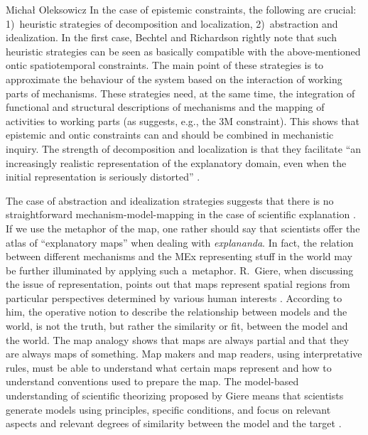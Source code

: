\begin{artengenv}{Michał Oleksowicz}
In the case of epistemic constraints, the following are crucial: 1)~heuristic strategies of decomposition and localization, 2)~abstraction and idealization. In the first case, Bechtel and Richardson
\parencite*[][]{bechtel_discovering_2010} %
 rightly note that such heuristic strategies can be seen as basically compatible with the above-mentioned ontic spatiotemporal constraints. The main point of these strategies is to approximate the behaviour of the system based on the interaction of working parts of mechanisms. These strategies need, at the same time, the integration of functional and structural descriptions of mechanisms and the mapping of activities to working parts (as suggests, e.g., the 3M constraint). This shows that epistemic and ontic constraints can and should be combined in mechanistic inquiry. The strength of decomposition and localization is that they facilitate ``an increasingly realistic representation of the explanatory domain, even when the initial representation is seriously distorted'' 
\parencite[][p.8]{bechtel_discovering_2010}.%


The case of abstraction and idealization strategies suggests that there is no straightforward mechanism-model-mapping in the case of scientific explanation
\parencite{parker_model_2020}. %
If we use the metaphor of the map, one rather should say that scientists offer the atlas of ``explanatory maps'' when dealing with \textit{explananda}. In fact, the relation between different mechanisms and the MEx representing stuff in the world may be further illuminated by applying such a~metaphor. R.~Giere, when discussing the issue of representation, points out that maps represent spatial regions from particular perspectives determined by various human interests
\parencite[][pp.81–82]{giere_science_1999}. %
According to him, the operative notion to describe the relationship between models and the world, is not the truth, but rather the similarity or fit, between the model and the world. The map analogy shows that maps are always partial and that they are always maps of something. Map makers and map readers, using interpretative rules, must be able to understand what certain maps represent and how to understand conventions used to prepare the map. The model-based understanding of scientific theorizing proposed by Giere means that scientists generate models using principles, specific conditions, and focus on relevant aspects and relevant degrees of similarity between the model and the target
\parencite{giere_how_2004}.


\end{artengenv}

